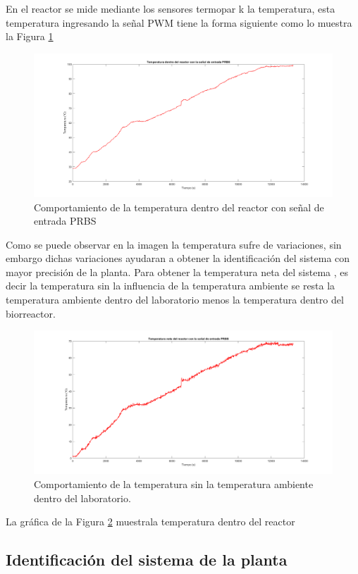 \documentclass[12pt]{article}
\begin{document}
	En el reactor se mide mediante los sensores termopar k  la temperatura, esta temperatura ingresando la señal PWM tiene la forma siguiente como lo muestra la Figura \ref{ Temperatura_con PRBS}
	
	\begin{figure}[h!]
		\centering
		\includegraphics[width=.8\linewidth]{imagenes/temperatura con prbs}
		\caption{Comportamiento de la temperatura dentro del reactor con señal de entrada PRBS }
		\label{ Temperatura_con PRBS}
	\end{figure}
	
	
	Como se puede observar en la imagen la temperatura sufre de variaciones,  sin embargo dichas variaciones ayudaran a obtener la identificación del sistema con mayor precisión de la planta.
	Para obtener la temperatura neta del sistema , es decir la temperatura sin la influencia de la temperatura ambiente se resta la temperatura ambiente dentro del laboratorio menos la temperatura dentro del biorreactor.
	
	\begin{figure}[h!]
		\centering
		\includegraphics[width=.7\linewidth]{imagenes/temp_neta}
		\caption{Comportamiento de la temperatura sin la temperatura ambiente dentro del laboratorio. }
		\label{ Temperatura neta_con PRBS}
	\end{figure}
	
	La gráfica de la Figura \ref{ Temperatura neta_con PRBS} muestrala temperatura dentro del reactor 
	
	
	
	\subsection{Identificación del sistema de la planta}	
	
\end{document}
